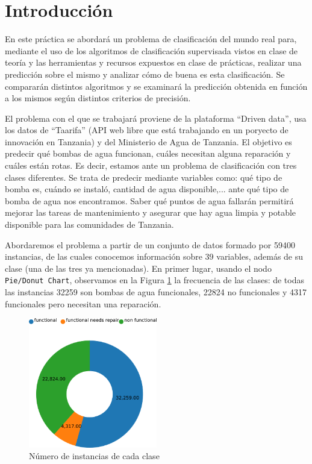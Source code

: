 \documentclass[a4paper, 20pt]{article}
\begin{document}
\section{Introducción}

En este práctica se abordará un problema de clasificación del mundo real para, mediante el uso de los algoritmos de clasificación supervisada vistos en clase de teoría y las herramientas y recursos expuestos en clase de prácticas, realizar una predicción sobre el mismo y analizar cómo de buena es esta clasificación. Se compararán distintos algoritmos y se examinará la predicción obtenida en función a los mismos según distintos criterios de precisión.

El problema con el que se trabajará proviene de la plataforma ``Driven data'', usa los datos de ``Taarifa'' (API web libre que está trabajando en un poryecto de innovación en Tanzania) y del Ministerio de Agua de Tanzania. El objetivo es predecir qué bombas de agua funcionan, cuáles necesitan alguna reparación y cuáles están rotas. Es decir, estamos ante un problema de clasificación con tres clases diferentes. Se trata de predecir mediante variables como: qué tipo de bomba es, cuándo se instaló, cantidad de agua disponible,... ante qué tipo de bomba de agua nos encontramos. Saber qué puntos de agua fallarán permitirá mejorar las tareas de mantenimiento y asegurar que hay agua limpia y potable disponible para las comunidades de Tanzania.

Abordaremos el problema a partir de un conjunto de datos formado por 59400 instancias, de las cuales conocemos información sobre 39 variables, además de su clase (una de las tres ya mencionadas).
En primer lugar, usando el nodo \texttt{Pie/Donut Chart}, observamos en la Figura \ref{fig:clases1} la frecuencia de las clases: de todas las instancias 32259 son bombas de agua funcionales, 22824 no funcionales y 4317 funcionales pero necesitan una reparación.

\begin{figure}[H]
    \centering
    \includegraphics[width=0.5\textwidth]{chart1}
    \caption{Número de instancias de cada clase}
    \label{fig:clases1}
\end{figure}
\end{document}
